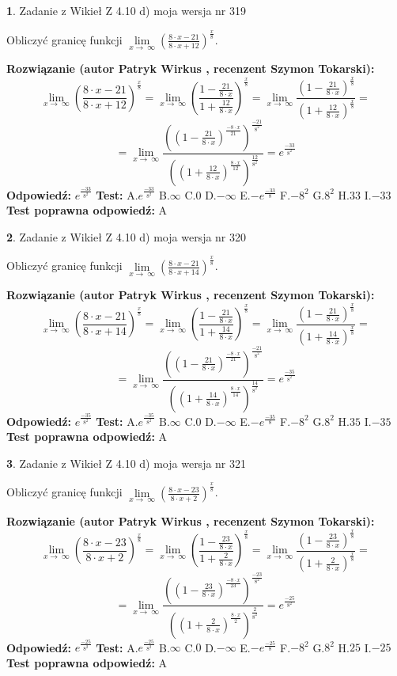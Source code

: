 \documentclass[12pt, a4paper]{article}
\theoremstyle{definition} %
\newtheorem{zad}{}
\newcommand{\zadStart}[1]{\begin{zad}#1\newline}
\newcommand{\zadStop}{\end{zad}}
\newcommand{\rozwStart}[2]{\noindent \textbf{Rozwiązanie (autor #1 , recenzent #2): }\newline}
\newcommand{\rozwStop}{\newline}
\newcommand{\odpStart}{\noindent \textbf{Odpowiedź:}\newline}
\newcommand{\odpStop}{\newline}
\newcommand{\testStart}{\noindent \textbf{Test:}\newline}
\newcommand{\testStop}{\newline}
\newcommand{\kluczStart}{\noindent \textbf{Test poprawna odpowiedź:}\newline}
\newcommand{\kluczStop}{\newline}
\begin{document}
\zadStart{Zadanie z Wikieł Z 4.10 d) moja wersja nr 319}


Obliczyć granicę funkcji  $\lim\limits_{x\to\ \infty}(\frac{8\cdot x-21}{8\cdot x+12})^{\frac{x}{8}}$.
\zadStop
\rozwStart{Patryk Wirkus}{Szymon Tokarski}
$$\lim\limits_{x\to\ \infty}(\frac{8\cdot x-21}{8\cdot x+12})^{\frac{x}{8}} = \lim\limits_{x\to\ \infty}(\frac{1-\frac{21}{8\cdot x}}{1+\frac{12}{8\cdot x}})^{\frac{x}{8}}=\lim\limits_{x\to\ \infty}\frac{(1-\frac{21}{8\cdot x})^{\frac{x}{8}}}{(1+\frac{12}{8\cdot x})^{\frac{x}{8}}}=$$
$$=\lim\limits_{x\to\ \infty}\frac{((1-\frac{21}{8\cdot x})^{\frac{-8\cdot x}{21}})^{\frac{-21}{8^{2}}}}{((1+\frac{12}{8\cdot x})^{\frac{8\cdot x}{12}})^{\frac{12}{8^{2}}}}=e^{\frac{-33}{8^{2}}}$$
\rozwStop
\odpStart
$e^{\frac{-33}{8^{2}}}$
\odpStop
\testStart
A.$e^{\frac{-33}{8^{2}}}$ B.$\infty$ C.$0$ D.$-\infty$ E.$-e^{\frac{-33}{8}}$
F.$-8^{2}$ G.$8^{2}$
H.$33$
I.$-33$
\testStop
\kluczStart
A
\kluczStop



\zadStart{Zadanie z Wikieł Z 4.10 d) moja wersja nr 320}


Obliczyć granicę funkcji  $\lim\limits_{x\to\ \infty}(\frac{8\cdot x-21}{8\cdot x+14})^{\frac{x}{8}}$.
\zadStop
\rozwStart{Patryk Wirkus}{Szymon Tokarski}
$$\lim\limits_{x\to\ \infty}(\frac{8\cdot x-21}{8\cdot x+14})^{\frac{x}{8}} = \lim\limits_{x\to\ \infty}(\frac{1-\frac{21}{8\cdot x}}{1+\frac{14}{8\cdot x}})^{\frac{x}{8}}=\lim\limits_{x\to\ \infty}\frac{(1-\frac{21}{8\cdot x})^{\frac{x}{8}}}{(1+\frac{14}{8\cdot x})^{\frac{x}{8}}}=$$
$$=\lim\limits_{x\to\ \infty}\frac{((1-\frac{21}{8\cdot x})^{\frac{-8\cdot x}{21}})^{\frac{-21}{8^{2}}}}{((1+\frac{14}{8\cdot x})^{\frac{8\cdot x}{14}})^{\frac{14}{8^{2}}}}=e^{\frac{-35}{8^{2}}}$$
\rozwStop
\odpStart
$e^{\frac{-35}{8^{2}}}$
\odpStop
\testStart
A.$e^{\frac{-35}{8^{2}}}$ B.$\infty$ C.$0$ D.$-\infty$ E.$-e^{\frac{-35}{8}}$
F.$-8^{2}$ G.$8^{2}$
H.$35$
I.$-35$
\testStop
\kluczStart
A
\kluczStop



\zadStart{Zadanie z Wikieł Z 4.10 d) moja wersja nr 321}


Obliczyć granicę funkcji  $\lim\limits_{x\to\ \infty}(\frac{8\cdot x-23}{8\cdot x+2})^{\frac{x}{8}}$.
\zadStop
\rozwStart{Patryk Wirkus}{Szymon Tokarski}
$$\lim\limits_{x\to\ \infty}(\frac{8\cdot x-23}{8\cdot x+2})^{\frac{x}{8}} = \lim\limits_{x\to\ \infty}(\frac{1-\frac{23}{8\cdot x}}{1+\frac{2}{8\cdot x}})^{\frac{x}{8}}=\lim\limits_{x\to\ \infty}\frac{(1-\frac{23}{8\cdot x})^{\frac{x}{8}}}{(1+\frac{2}{8\cdot x})^{\frac{x}{8}}}=$$
$$=\lim\limits_{x\to\ \infty}\frac{((1-\frac{23}{8\cdot x})^{\frac{-8\cdot x}{23}})^{\frac{-23}{8^{2}}}}{((1+\frac{2}{8\cdot x})^{\frac{8\cdot x}{2}})^{\frac{2}{8^{2}}}}=e^{\frac{-25}{8^{2}}}$$
\rozwStop
\odpStart
$e^{\frac{-25}{8^{2}}}$
\odpStop
\testStart
A.$e^{\frac{-25}{8^{2}}}$ B.$\infty$ C.$0$ D.$-\infty$ E.$-e^{\frac{-25}{8}}$
F.$-8^{2}$ G.$8^{2}$
H.$25$
I.$-25$
\testStop
\kluczStart
A
\kluczStop
\end{document}
